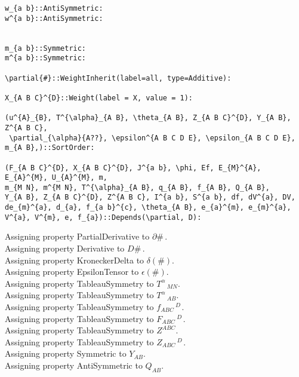 \documentclass[11pt]{article}
\begin{document}
{\begin{verbatim}
w_{a b}::AntiSymmetric:
w^{a b}::AntiSymmetric:


m_{a b}::Symmetric:
m^{a b}::Symmetric:

\partial{#}::WeightInherit(label=all, type=Additive):

X_{A B C}^{D}::Weight(label = X, value = 1):

(u^{A}_{B}, T^{\alpha}_{A B}, \theta_{A B}, Z_{A B C}^{D}, Y_{A B}, Z^{A B C},
 \partial_{\alpha}{A??}, \epsilon^{A B C D E}, \epsilon_{A B C D E}, m_{A B},)::SortOrder:

(F_{A B C}^{D}, X_{A B C}^{D}, J^{a b}, \phi, Ef, E_{M}^{A}, E_{A}^{M}, U_{A}^{M}, m,
m_{M N}, m^{M N}, T^{\alpha}_{A B}, q_{A B}, f_{A B}, Q_{A B},
Y_{A B}, Z_{A B C}^{D}, Z^{A B C}, I^{a b}, S^{a b}, df, dV^{a}, DV,
de_{m}^{a}, d_{a}, f_{a b}^{c}, \theta_{A B}, e_{a}^{m}, e_{m}^{a}, V^{a}, V^{m}, e, f_{a})::Depends(\partial, D):
\end{verbatim}}
Assigning property PartialDerivative to $\partial{\#}\, $.
\\
Assigning property Derivative to $D{\#}\, $.
\\
Assigning property KroneckerDelta to $\delta(\#)$.
\\
Assigning property EpsilonTensor to $\epsilon(\#)$.
\\
Assigning property TableauSymmetry to ${T}^{\alpha}\,_{M N}$.
\\
Assigning property TableauSymmetry to ${T}^{\alpha}\,_{A B}$.
\\
Assigning property TableauSymmetry to ${f}_{A B C}\,^{D\, }$.
\\
Assigning property TableauSymmetry to ${F}_{A B C}\,^{D\, }$.
\\
Assigning property TableauSymmetry to ${Z}^{A B C}$.
\\
Assigning property TableauSymmetry to ${Z}_{A B C}\,^{D\, }$.
\\
Assigning property Symmetric to ${Y}_{A B}$.
\\
Assigning property AntiSymmetric to ${Q}_{A B}$.
\\
\end{document}
